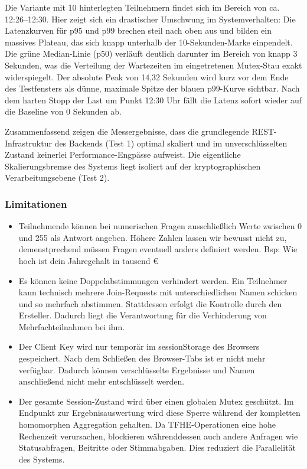 Die Variante mit 10 hinterlegten Teilnehmern findet sich im Bereich von ca. 12:26–12:30. Hier zeigt sich ein drastischer Umschwung im Systemverhalten: Die Latenzkurven für p95 und p99 brechen steil nach oben aus und bilden ein massives Plateau, das sich knapp unterhalb der 10-Sekunden-Marke einpendelt. Die grüne Median-Linie (p50) verläuft deutlich darunter im Bereich von knapp 3 Sekunden, was die Verteilung der Wartezeiten im eingetretenen Mutex-Stau exakt widerspiegelt. Der absolute Peak von 14,32 Sekunden wird kurz vor dem Ende des Testfensters als dünne, maximale Spitze der blauen p99-Kurve sichtbar. Nach dem harten Stopp der Last um Punkt 12:30 Uhr fällt die Latenz sofort wieder auf die Baseline von 0 Sekunden ab.

Zusammenfassend zeigen die Messergebnisse, dass die grundlegende REST-Infrastruktur des Backends (Test 1) optimal skaliert und im unverschlüsselten Zustand keinerlei Performance-Engpässe aufweist. Die eigentliche Skalierungsbremse des Systems liegt isoliert auf der kryptographischen Verarbeitungsebene (Test 2).

\subsubsection{Limitationen}

\begin{itemize}
    \item Teilnehmende können bei numerischen Fragen ausschließlich Werte zwischen 0 und 255 als Antwort angeben. Höhere Zahlen lassen wir bewusst nicht zu, demenstprechend müssen Fragen eventuell anders definiert werden. Bsp: Wie hoch ist dein Jahregehalt in tausend €
    \item Es können keine Doppelabstimmungen verhindert werden. Ein Teilnehmer kann technisch mehrere Join-Requests mit unterschiedlichen Namen schicken und so mehrfach abstimmen. Stattdessen erfolgt die Kontrolle durch den Ersteller. Dadurch liegt die Verantwortung für die Verhinderung von Mehrfachteilnahmen bei ihm.
    \item Der Client Key wird nur temporär im sessionStorage des Browsers gespeichert. Nach dem Schließen des Browser-Tabs ist er nicht mehr verfügbar. Dadurch können verschlüsselte Ergebnisse und Namen anschließend nicht mehr entschlüsselt werden.
    \item Der gesamte Session-Zustand wird über einen globalen Mutex geschützt. Im Endpunkt zur Ergebnisauswertung wird diese Sperre während der kompletten homomorphen Aggregation gehalten. Da TFHE-Operationen eine hohe Rechenzeit verursachen, blockieren währenddessen auch andere Anfragen wie Statusabfragen, Beitritte oder Stimmabgaben. Dies reduziert die Parallelität des Systems.
\end{itemize}